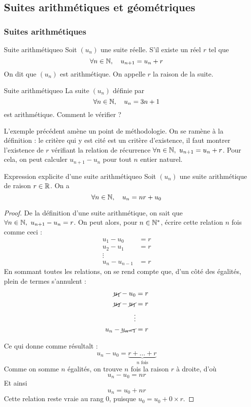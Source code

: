 \subsection{Suites arithmétiques et géométriques}
\subsubsection{Suites arithmétiques}
\begin{definition}{Suite arithmétique}{o}
Soit $(u_n)$ une suite réelle. S'il existe un réel $r$ tel que \[\forall n\in\mathbb{N},\quad u_{n+1}=u_n+r\]
On dit que $(u_n)$ est arithmétique. On appelle $r$ la raison de la suite.
\end{definition}

\begin{exemple}{Suite arithmétique}{o}
La suite $(u_n)$ définie par \[\forall n\in\mathbb{N},\quad u_n=3n+1\] est arithmétique. Comment le vérifier ?
\end{exemple}

L'exemple précédent amène un point de méthodologie. On se ramène à la définition : le critère qui y est cité est un critère d'existence, il faut montrer l'existence de $r$ vérifiant la relation de récurrence $\forall n\in\mathbb{N},\ u_{n+1}=u_n+r$. Pour cela, on peut calculer $u_{n+1}-u_n$ pour tout $n$ entier naturel.

\begin{proposition}{Expression explicite d'une suite arithmétique}{o}
Soit $(u_n)$ une suite arithmétique de raison $r\in\mathbb{R}$. On a \[\forall n\in\mathbb{N},\quad u_n=nr+u_0\]
\end{proposition}

\begin{proof}
	De la définition d'une suite arithmétique, on sait que $\forall n\in\mathbb{N},\ u_{n+1}-u_n=r$. On peut alors, pour $n\in\mathbb{N}^*$, écrire cette relation $n$ fois comme ceci : 
	\begin{align*}
		u_1-u_0 &= r\\
		u_2-u_1 &= r\\
		\vdots\\
		u_n-u_{n-1} &= r
	\end{align*}
	En sommant toutes les relations, on se rend compte que, d'un côté des égalités, plein de termes s'annulent :
	\begin{align*}
		\cancel{u_1}-u_0 &= r\\
		\cancel{u_2}-\cancel{u_1} &= r\\
		\vdots\\
		u_n-\cancel{u_{n-1}} &= r
	\end{align*}

	Ce qui donne comme résultalt : \[u_n-u_0=\underbrace{r+\dots+r}_{n\text{ fois}}\]
	Comme on somme $n$ égalités, on trouve $n$ fois la raison $r$ à droite, d'où \[u_n-u_0=nr\]
	Et ainsi \[u_n=u_0+nr\]
	Cette relation reste vraie au rang $0$, puisque $u_0=u_0+0\times r$.
\end{proof}

